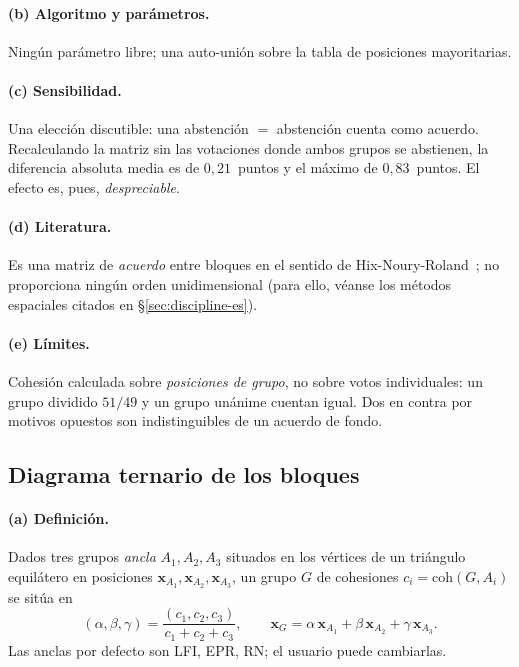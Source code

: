 \paragraph{(b) Algoritmo y parámetros.} Ningún parámetro libre; una auto-unión
sobre la tabla de posiciones mayoritarias.

\paragraph{(c) Sensibilidad.} Una elección discutible: una \og{}abstención $=$
abstención\fg{} cuenta como acuerdo. Recalculando la matriz sin las votaciones donde
ambos grupos se abstienen, la diferencia absoluta media es de $0{,}21$~puntos y el
máximo de $0{,}83$~puntos. El efecto es, pues, \emph{despreciable}.

\paragraph{(d) Literatura.} Es una matriz de \emph{acuerdo} entre bloques en el
sentido de Hix-Noury-Roland~\cite{hnr2007}; no proporciona ningún orden
unidimensional (para ello, véanse los métodos espaciales citados en
§\ref{sec:discipline-es}).

\paragraph{(e) Límites.} Cohesión calculada sobre \emph{posiciones de grupo}, no
sobre votos individuales: un grupo dividido $51/49$ y un grupo unánime cuentan
igual. Dos \og{}en contra\fg{} por motivos opuestos son indistinguibles de un
acuerdo de fondo.

\subsection{Diagrama ternario de los bloques}\label{sec:ternaire-es}

\paragraph{(a) Definición.} Dados tres grupos \emph{ancla} $A_1,A_2,A_3$ situados en
los vértices de un triángulo equilátero en posiciones $\mathbf{x}_{A_1},\mathbf{x}_{A_2},\mathbf{x}_{A_3}$,
un grupo $G$ de cohesiones $c_i=\mathrm{coh}(G,A_i)$ se sitúa en
\[
(\alpha,\beta,\gamma)=\frac{(c_1,c_2,c_3)}{c_1+c_2+c_3},\qquad
\mathbf{x}_G=\alpha\,\mathbf{x}_{A_1}+\beta\,\mathbf{x}_{A_2}+\gamma\,\mathbf{x}_{A_3}.
\]
Las anclas por defecto son LFI, EPR, RN; el usuario puede cambiarlas.

